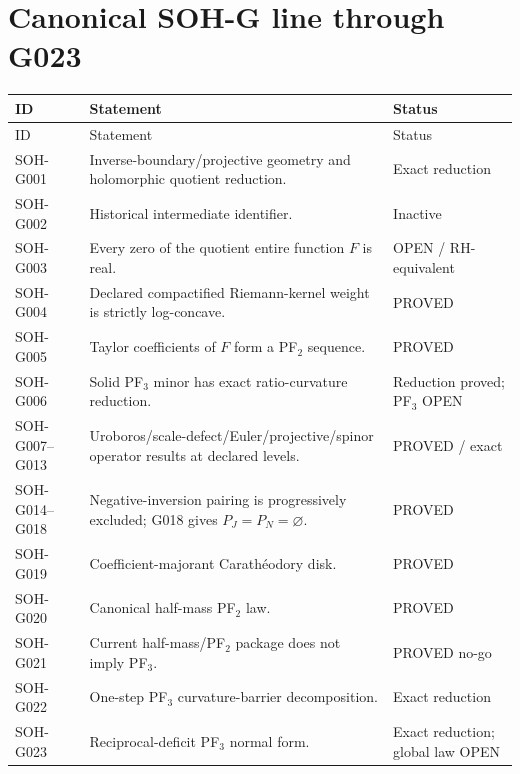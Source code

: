 \section{Canonical SOH-G line through G023}
\begin{longtable}{@{}p{}p{}p{}@{}}
\toprule ID & Statement & Status\\
\midrule\endfirsthead\toprule ID & Statement & Status\\\midrule\endhead
SOH-G001 & Inverse-boundary/projective geometry and holomorphic quotient reduction. & Exact reduction\\
SOH-G002 & Historical intermediate identifier. & Inactive\\
SOH-G003 & Every zero of the quotient entire function $F$ is real. & OPEN / RH-equivalent\\
SOH-G004 & Declared compactified Riemann-kernel weight is strictly log-concave. & PROVED\\
SOH-G005 & Taylor coefficients of $F$ form a PF$_2$ sequence. & PROVED\\
SOH-G006 & Solid PF$_3$ minor has exact ratio-curvature reduction. & Reduction proved; PF$_3$ OPEN\\
SOH-G007--G013 & Uroboros/scale-defect/Euler/projective/spinor operator results at declared levels. & PROVED / exact\\
SOH-G014--G018 & Negative-inversion pairing is progressively excluded; G018 gives $P_J=P_N=\varnothing$. & PROVED\\
SOH-G019 & Coefficient-majorant Carath\'eodory disk. & PROVED\\
SOH-G020 & Canonical half-mass PF$_2$ law. & PROVED\\
SOH-G021 & Current half-mass/PF$_2$ package does not imply PF$_3$. & PROVED no-go\\
SOH-G022 & One-step PF$_3$ curvature-barrier decomposition. & Exact reduction\\
SOH-G023 & Reciprocal-deficit PF$_3$ normal form. & Exact reduction; global law OPEN\\
\bottomrule
\end{longtable}

